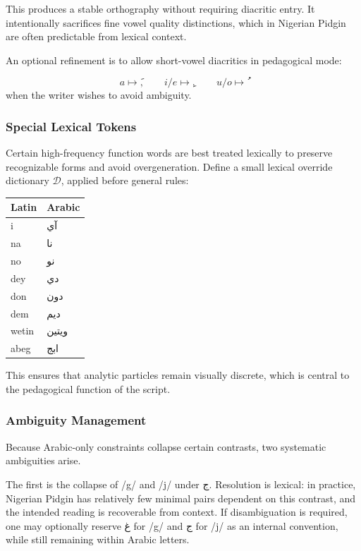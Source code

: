 \documentclass[12pt]{article}
\begin{document}
This produces a stable orthography without requiring diacritic entry. It intentionally sacrifices fine vowel quality distinctions, which in Nigerian Pidgin are often predictable from lexical context.

An optional refinement is to allow short-vowel diacritics in pedagogical mode:

\[
a \mapsto َ,\qquad i/e \mapsto ِ,\qquad u/o \mapsto ُ
\]
when the writer wishes to avoid ambiguity.

\subsubsection{Special Lexical Tokens}

Certain high-frequency function words are best treated lexically to preserve recognizable forms and avoid overgeneration. Define a small lexical override dictionary $\mathcal{D}$, applied before general rules:

\begin{center}
\begin{tabular}{ll}
Latin & Arabic \\
\hline
i & آي \\
na & نا \\
no & نو \\
dey & دي \\
don & دون \\
dem & ديم \\
wetin & ويتين \\
abeg & ابج \\
\end{tabular}
\end{center}

This ensures that analytic particles remain visually discrete, which is central to the pedagogical function of the script.

\subsubsection{Ambiguity Management}

Because Arabic-only constraints collapse certain contrasts, two systematic ambiguities arise.

The first is the collapse of /g/ and /j/ under ج. Resolution is lexical: in practice, Nigerian Pidgin has relatively few minimal pairs dependent on this contrast, and the intended reading is recoverable from context. If disambiguation is required, one may optionally reserve غ for /g/ and ج for /j/ as an internal convention, while still remaining within Arabic letters.
\end{document}
